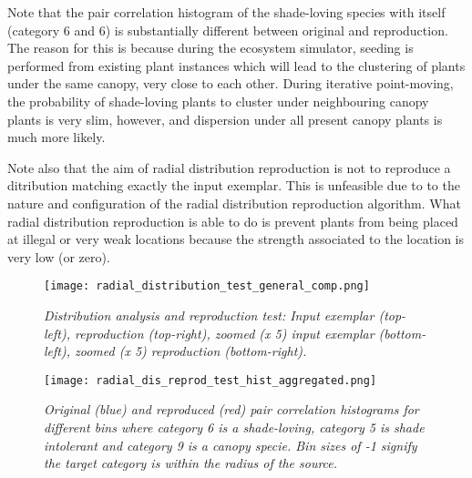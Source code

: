 Note that the pair correlation histogram of the shade-loving species with itself (category 6 and 6) is substantially different between original and reproduction. The reason for this is because during the ecosystem simulator, seeding is performed from existing plant instances which will lead to the clustering of plants under the same canopy, very close to each other. During iterative point-moving, the probability of shade-loving plants to cluster under neighbouring canopy plants is very slim, however, and dispersion under all present canopy plants is much more likely.

Note also that the aim of radial distribution reproduction is not to reproduce a ditribution matching exactly the input exemplar. This is unfeasible due to to the nature and configuration of the radial distribution reproduction algorithm. What radial distribution reproduction is able to do is prevent plants from being placed at illegal or very weak locations because the strength associated to the location is very low (or zero).

\begin{figure}
\center
	\texttt{[image: radial\_distribution\_test\_general\_comp.png]}
	\caption{ \textit{Distribution analysis and reproduction test: Input exemplar (top-left), reproduction (top-right), zoomed (x 5) input exemplar (bottom-left), zoomed (x 5) reproduction (bottom-right).} }	
	\label{fig:radial_dist_test}
\end{figure}

\begin{figure}
\center
	\texttt{[image: radial\_dis\_reprod\_test\_hist\_aggregated.png]}
	\caption{ \textit{Original (blue) and reproduced (red) pair correlation histograms for different bins where category 6 is a shade-loving, category 5 is shade intolerant and category 9 is a canopy specie. Bin sizes of -1 signify the target category is within the radius of the source.}}	
	\label{fig:hisogram_comp}
\end{figure}
